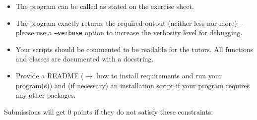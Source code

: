 \documentclass{exam}
\begin{document}
\begin{itemize}
  \item The program can be called as stated on the exercise sheet.
  \item The program exactly returns the required output (neither less nor more) -- please use a \texttt{--verbose} option to increase the verbosity level for debugging.
  \item Your scripts should be commented to be readable for the tutors. All functions and classes are documented with a docstring. 
  \item Provide a README ($\to$ how to install requirements and run your program(s)) and (if necessary) an installation script if your program requires any other packages.
\end{itemize}

\bigskip

Submissions will get $0$ points if they do not satisfy these constraints.
\end{document}
